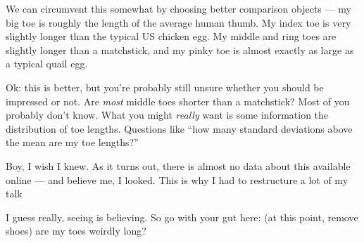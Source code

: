 \documentclass{fkpset}
\begin{document}
\begin{solution}[Outline.]
  We can circumvent this somewhat by choosing better comparison objects ---
  my big toe is roughly the length of the average human thumb. My index toe is
  very slightly longer than the typical US chicken egg. My middle and ring toes
  are slightly longer than a matchstick, and my pinky toe is almost exactly as
  large as a typical quail egg.

  Ok: this is better, but you're probably still unsure whether you should be
  impressed or not. Are \emph{most} middle toes shorter than a matchstick? Most
  of you probably don't know. What you might \emph{really} want is some
  information the distribution of toe lengths. Questions like ``how many
  standard deviations above the mean are my toe lengths?''

  Boy, I wish I knew. As it turns out, there is almost no data about this
  available online --- and believe me, I looked. This is why I had to
  restructure a lot of my talk

  I guess really, seeing is believing. So go with your gut here: (at this point,
  remove shoes) are my toes weirdly long?


\end{solution}
\end{document}

